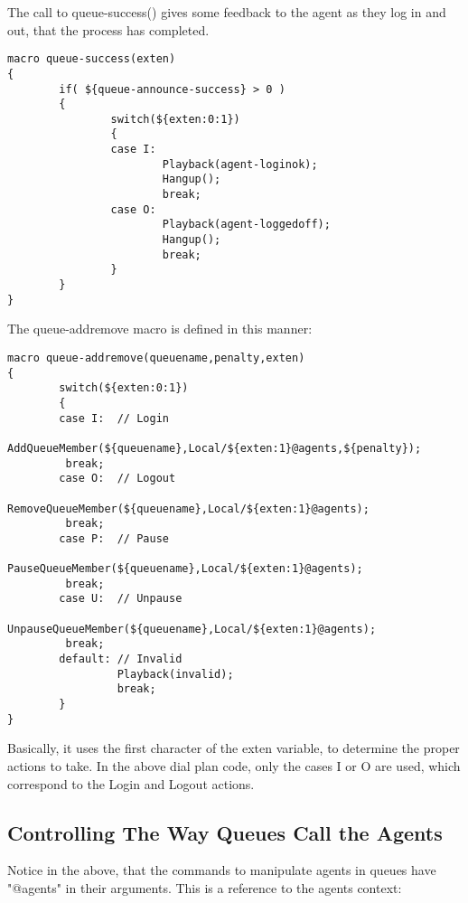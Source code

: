 The call to queue-success() gives some feedback to the agent
as they log in and out, that the process has completed.

\begin{astlisting}
\begin{verbatim}
macro queue-success(exten)
{
        if( ${queue-announce-success} > 0 )
        {
                switch(${exten:0:1})
                {
                case I:
                        Playback(agent-loginok);
                        Hangup();
                        break;
                case O:
                        Playback(agent-loggedoff);
                        Hangup();
                        break;
                }
        }
}
\end{verbatim}
\end{astlisting}

The queue-addremove macro is defined in this manner:

\begin{astlisting}
\begin{verbatim}
macro queue-addremove(queuename,penalty,exten)
{
        switch(${exten:0:1})
        {
        case I:  // Login
                 AddQueueMember(${queuename},Local/${exten:1}@agents,${penalty});
		 break;
        case O:  // Logout
                 RemoveQueueMember(${queuename},Local/${exten:1}@agents);
		 break;
        case P:  // Pause
                 PauseQueueMember(${queuename},Local/${exten:1}@agents);
		 break;
        case U:  // Unpause
                 UnpauseQueueMember(${queuename},Local/${exten:1}@agents);
		 break;
        default: // Invalid
                 Playback(invalid);
                 break;
        }
}
\end{verbatim}
\end{astlisting}

Basically, it uses the first character of the exten variable, to determine the
proper actions to take. In the above dial plan code, only the cases I or O are used,
which correspond to the Login and Logout actions.


\subsection{Controlling The Way Queues Call the Agents}

Notice in the above, that the commands to manipulate agents in queues have
"@agents" in their arguments. This is a reference to the agents context:

